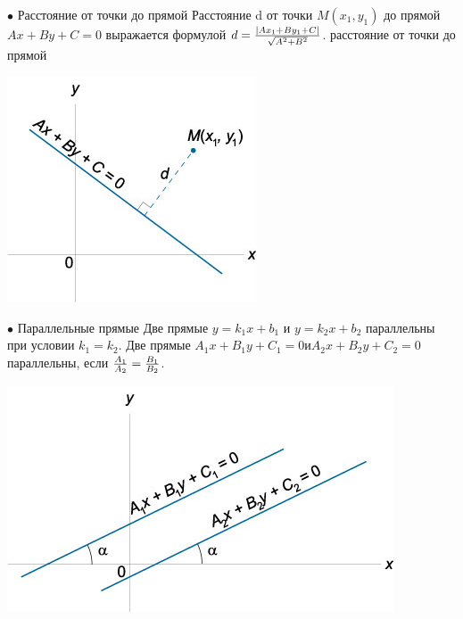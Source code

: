 \documentclass[oneside]{book}
\begin{document}
\begin{enumerate}
\begin{itemize}
\begin{enumerate}
$\bullet$ Расстояние от точки до прямой
Расстояние d от точки $M\left( {{x_1},{y_1}} \right)$ до прямой $Ax + By + C = 0$ выражается формулой
$d = \large\frac{{\left| {A{x_1} + B{y_1} + C} \right|}}{{\sqrt {{A^2} + {B^2}} }}\normalsize$.
расстояние от точки до прямой
\begin{center}
\includegraphics[scale=0.4]{./pics/14.jpg}
\end{center}

$\bullet$ Параллельные прямые
Две прямые $y = {k_1}x + {b_1} $ и $ y = {k_2}x + {b_2}$ параллельны при условии
${k_1} = {k_2}$.
Две прямые ${A_1}x + {B_1}y + {C_1} = 0 и {A_2}x + {B_2}y + {C_2} = 0$ параллельны, если
$\large\frac{{{A_1}}}{{{A_2}}}\normalsize = \large\frac{{{B_1}}}{{{B_2}}}\normalsize$.
\begin{center}
\includegraphics[scale=0.4]{./pics/15.jpg}
\end{center}


\end{enumerate}
\end{itemize}
\end{enumerate}
\end{document}
